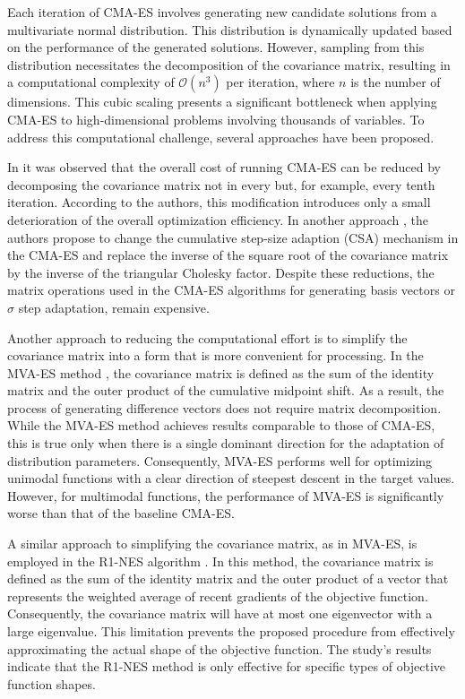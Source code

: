 \documentclass[dvipsnames,format=sigconf,anonymous=false,review=false]{acmart}
\begin{document}
Each iteration of CMA-ES involves generating new candidate solutions from a multivariate normal distribution. This distribution is dynamically updated based on the performance of the generated solutions. However, sampling from this distribution necessitates the decomposition of the covariance matrix, resulting in a computational complexity of $\mathcal{O}(n^3)$ per iteration, where $n$ is the number of dimensions. This cubic scaling presents a significant bottleneck when applying CMA-ES to high-dimensional problems involving thousands of variables. To address this computational challenge, several approaches have been proposed.

In \cite{SEPCMAES-2008} it was observed that the overall cost of running CMA-ES can be reduced by decomposing the covariance matrix not in every but, for example, every tenth iteration. According to the authors, this modification introduces only a small deterioration of the overall optimization efficiency. In another approach \cite{NIPS2016_CholeskyCMAES}, the authors propose to change the cumulative step-size adaption (CSA) mechanism in the CMA-ES and replace the inverse of the square root of the covariance matrix by the inverse of the triangular Cholesky factor. Despite these reductions, the matrix operations used in the CMA-ES algorithms for generating basis vectors or $\sigma$ step adaptation, remain expensive. 

Another approach to reducing the computational effort is to simplify the covariance matrix into a form that is more convenient for processing. In the MVA-ES method \cite{Poland2001}, the covariance matrix is defined as the sum of the identity matrix and the outer product of the cumulative midpoint shift. As a result, the process of generating difference vectors does not require matrix decomposition. While the MVA-ES method achieves results comparable to those of CMA-ES, this is true only when there is a single dominant direction for the adaptation of distribution parameters. Consequently, MVA-ES performs well for optimizing unimodal functions with a clear direction of steepest descent in the target values. However, for multimodal functions, the performance of MVA-ES is significantly worse than that of the baseline CMA-ES.

A similar approach to simplifying the covariance matrix, as in MVA-ES, is employed in the R1-NES algorithm \cite{Sun2013}. In this method, the covariance matrix is defined as the sum of the identity matrix and the outer product of a vector that represents the weighted average of recent gradients of the objective function. Consequently, the covariance matrix will have at most one eigenvector with a large eigenvalue. This limitation prevents the proposed procedure from effectively approximating the actual shape of the objective function. The study's results indicate that the R1-NES method is only effective for specific types of objective function shapes.
\end{document}
